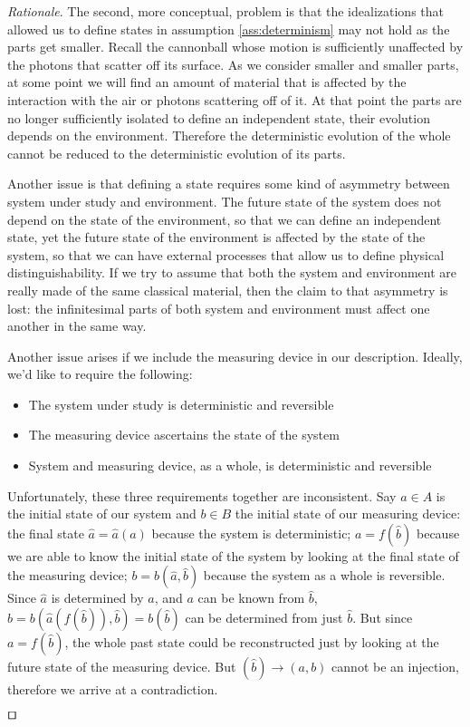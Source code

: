 \documentclass[smallextended]{svjour3}
\numberwithin{equation}{section}
\newenvironment{rationale}{\emph{Rationale}.}{\hfill\(\qed\)}
\theoremstyle{definition}
\newenvironment{rationale}{\emph{Rationale}.}{\qed}
\begin{document}
\begin{rationale}
	The second, more conceptual, problem is that the idealizations that allowed us to define states in assumption \ref{ass:determinism} may not hold as the parts get smaller. Recall the cannonball whose motion is sufficiently unaffected by the photons that scatter off its surface. As we consider smaller and smaller parts, at some point we will find an amount of material that is affected by the interaction with the air or photons scattering off of it. At that point the parts are no longer sufficiently isolated to define an independent state, their evolution depends on the environment. Therefore the deterministic evolution of the whole cannot be reduced to the deterministic evolution of its parts.
	
	Another issue is that defining a state requires some kind of asymmetry between system under study and environment. The future state of the system does not depend on the state of the environment, so that we can define an independent state, yet the future state of the environment is affected by the state of the system, so that we can have external processes that allow us to define physical distinguishability. If we try to assume that both the system and environment are really made of the same classical material, then the claim to that asymmetry is lost: the infinitesimal parts of both system and environment must affect one another in the same way.
	
	Another issue arises if we include the measuring device in our description. Ideally, we'd like to require the following:
	\begin{itemize}[noitemsep]
		\item The system under study is deterministic and reversible
		\item The measuring device ascertains the state of the system
		\item System and measuring device, as a whole, is deterministic and reversible
	\end{itemize}
	Unfortunately, these three requirements together are inconsistent. Say $a \in A$ is the initial state of our system and $b \in B$ the initial state of our measuring device: the final state $\hat{a}=\hat{a}(a)$ because the system is deterministic; $a=f(\hat{b})$ because we are able to know the initial state of the system by looking at the final state of the measuring device; $b=b(\hat{a},\hat{b})$ because the system as a whole is reversible. Since $\hat{a}$ is determined by $a$, and $a$ can be known from $\hat{b}$, $b = b(\hat{a}(f(\hat{b})), \hat{b}) = b(\hat{b})$ can be determined from just $\hat{b}$. But since $a=f(\hat{b})$, the whole past state could be reconstructed just by looking at the future state of the measuring device. But $(\hat{b}) \rightarrow (a, b)$ cannot be an injection, therefore we arrive at a contradiction.
	

\end{rationale}
\end{document}

